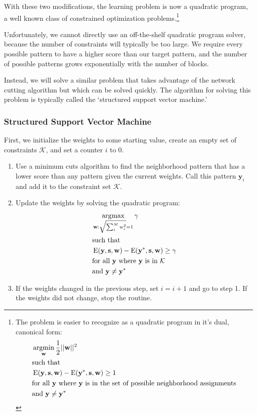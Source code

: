 With these two modifications, the learning problem is now a quadratic
program, a well known class of constrained optimization
problems.\footnote{The problem is easier to recognize as a quadratic
  program in it's dual, canonical form:
%
\begin{align*}
&\operatorname*{\arg\!\min}_{\mathbf{w}} \frac{1}{2}||\mathbf{w}||^2 \\
&\text{such that} \\
&\operatorname{E}(\mathbf{y}, \mathbf{s}, \mathbf{w})
- \operatorname{E}(\mathbf{y}^*, \mathbf{s}, \mathbf{w}) \geq 1 \\ 
&\text{for all } \mathbf{y} \text{ where } \mathbf{y} \text{ is in the set of
  possible neighborhood assignments}\\
&\text{and } \mathbf{y} \neq \mathbf{y}^*
\end{align*}
}

Unfortunately, we cannot directly use an off-the-shelf quadratic
program solver, because the number of constraints will typically be
too large. We require every possible pattern to have a higher
score than our target pattern, and the number of possible patterns
grows exponentially with the number of blocks.

Instead, we will solve a similar problem that takes advantage of the
network cutting algorithm but which can be solved
quickly. The algorithm for solving this problem is typically called
the `structured support vector machine.'\cite{szummer_learning_2008}
 

\subsubsection{Structured Support Vector Machine}
First, we initialize the weights to some starting value, create an
empty set of constraints $\mathcal{K}$, and set a counter $i$ to $0$.
\begin{enumerate}
\item Use a minimum cuts algorithm to find the neighborhood pattern
  that has a lower score than any pattern given the current weights.
  Call this pattern $\mathbf{y}_i$ and add it to the constraint
  set $\mathcal{K}$.

\item Update the weights by solving the quadratic program: 
%
\begin{align*}
&\operatorname*{\arg\!\max}_{\mathbf{w}:\sqrt{\sum_i^M w_i^2}=1} \mathbf{\gamma} \\
&\text{such that} \\
&\operatorname{E}(\mathbf{y}, \mathbf{s}, \mathbf{w})
- \operatorname{E}(\mathbf{y}^*, \mathbf{s}, \mathbf{w}) \geq \gamma\\ 
&\text{for all } \mathbf{y} \text{ where } \mathbf{y} \text{ is in } \mathcal{K}\\
&\text{and } \mathbf{y} \neq \mathbf{y}^*
\end{align*}
%

\item If the weights changed in the previous step, set $i = i + 1$ and
  go to step 1. If the weights did not change, stop the routine.
\end{enumerate}

